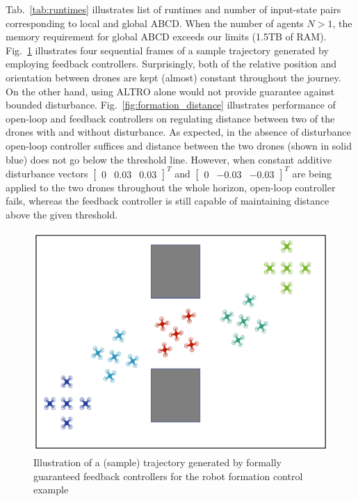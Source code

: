 Tab.~\ref{tab:runtimes} illustrates list of runtimes and number of input-state pairs corresponding to local and global ABCD. 
When the number of agents $N>1$, the memory requirement for global ABCD exceeds our limits (1.5TB of RAM). 
Fig.~\ref{fig:formation_ex} illustrates four sequential frames of a sample trajectory generated by employing feedback controllers. 
 Surprisingly, both of the relative position and orientation between drones are kept (almost) constant 
throughout the journey. 
On the other hand, using ALTRO alone would not provide guarantee against bounded disturbance. 
Fig.~\ref{fig:formation_distance} illustrates performance of open-loop and feedback controllers on regulating distance between two of the 
drones with and without disturbance. 
As expected, in the absence of disturbance open-loop controller suffices and distance between the two drones (shown in solid blue) does not go below the threshold line. 
However, when constant additive disturbance vectors $\begin{bmatrix}0 &0.03&0.03\end{bmatrix}^T$ and $\begin{bmatrix}0 &-0.03&-0.03\end{bmatrix}^T$ 
are being applied to the two drones throughout the whole horizon, open-loop controller fails, 
whereas the feedback controller is still capable of maintaining distance above the given threshold.

 \begin{figure}[t]
	\centering
	\includegraphics[scale=0.22]{figures/formation.pdf}
	\caption{Illustration of a (sample) trajectory generated by formally guaranteed feedback controllers for the robot formation control example}
	\label{fig:formation_ex}
\end{figure}

